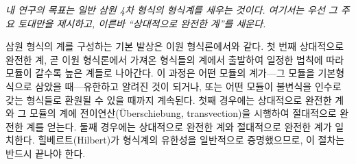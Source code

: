 \emph{내 연구의 목표는 일반 삼원 4차 형식의 형식계를 세우는 것이다. 여기서는 우선 그 주요 토대만을 제시하고, 이른바 ``상대적으로 완전한 계''를 세운다.}

삼원 형식의 계를 구성하는 기본 발상은 이원 형식론에서와 같다. 첫 번째 상대적으로 완전한 계, 곧 이원 형식론에서 가져온 형식들의 계에서 출발하여 일정한 법칙에 따라 모듈이 갈수록 높은 계들로 나아간다. 이 과정은 어떤 모듈의 계가---그 모듈을 기본형식으로 삼았을 때---유한하고 알려진 것이 되거나, 또는 어떤 모듈이 불변식을 인수로 갖는 형식들로 환원될 수 있을 때까지 계속된다. 첫째 경우에는 상대적으로 완전한 계와 그 모듈의 계에 전이연산(Überschiebung, transvection)을 시행하여 절대적으로 완전한 계를 얻는다. 둘째 경우에는 상대적으로 완전한 계와 절대적으로 완전한 계가 일치한다. 힐베르트(Hilbert)가 형식계의 유한성을 일반적으로 증명했으므로, 이 절차는 반드시 끝나야 한다.
